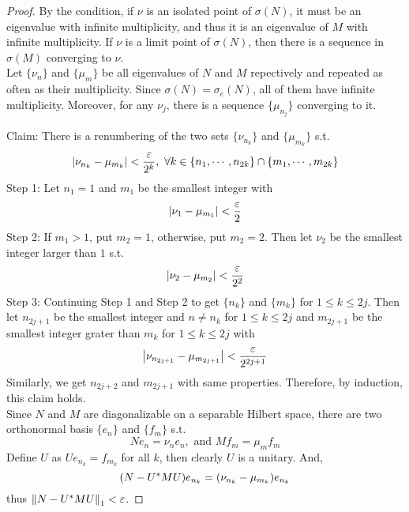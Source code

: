 \documentclass[a4paper,11pt]{report}
\begin{document}
\begin{proof}
	By the condition, if $\nu$ is an isolated point of $\sigma(N)$, it must be an eigenvalue with infinite multiplicity, and thus it is an eigenvalue of $M$ with infinite multiplicity. If $\nu$ is a limit point of $\sigma(N)$, then there is a sequence in $\sigma(M)$ converging to $\nu$. \\
	Let $\{\nu_n\}$ and $\{\mu_m\}$ be all eigenvalues of $N$ and $M$ repectively and repeated as often as their multiplicity. Since $\sigma(N) = \sigma_e(N)$, all of them have infinite multiplicity. Moreover, for any $\nu_j$, there is a sequence $\{\mu_{n_j}\}$ converging to it.
	\item Claim: There is a renumbering of the two sets $\{\nu_{n_k}\}$ and $\{\mu_{m_k}\}$ s.t. 
	\begin{equation*}
		\left\lvert\nu_{n_k} - \mu_{m_k}\right\lvert < \frac{\varepsilon}{2^k},~ \forall k \in \{n_1, \cdots, n_{2k}\} \cap \{m_1, \cdots, m_{2k}\}
	\end{equation*}
	Step 1: Let $n_1 = 1$ and $m_1$ be the smallest integer with 
	\begin{equation*}
		\left\lvert\nu_1 - \mu_{m_1}\right\lvert < \frac{\varepsilon}{2}
	\end{equation*}
	Step 2: If $m_1 > 1$, put $m_2 = 1$, otherwise, put $m_2 =2$. Then let $\nu_2$ be the smallest integer larger than $1$ s.t.
	\begin{equation*}
		\left\lvert\nu_2 - \mu_{m_2}\right\lvert < \frac{\varepsilon}{2^2}
	\end{equation*}
	Step 3: Continuing Step 1 and Step 2 to get $\{n_k\}$ and $\{m_k\}$ for $1 \leqslant k \leqslant 2j$. Then let $n_{2j+1}$ be the smallest integer and $n \neq n_k$ for $1 \leqslant k \leqslant 2j$ and $m_{2j+1}$ be the smallest integer grater than $m_k$ for $1 \leqslant k \leqslant 2j$ with
	\begin{equation*}
		\left\lvert\nu_{n_{2j+1}} - \mu_{m_{2j+1}}\right\lvert < \frac{\varepsilon}{2^{2j+1}}
	\end{equation*}
	Similarly, we get $n_{2j+2}$ and $m_{2j+1}$ with same properties. Therefore, by induction, this claim holds.\\
	Since $N$ and $M$ are diagonalizable on a separable Hilbert space, there are two orthonormal basis $\{e_n\}$ and $\{f_m\}$ s.t. 
	\begin{equation*}
		Ne_n = \nu_n e_n, \text{ and } Mf_m = \mu_m f_m
	\end{equation*}
	Define $U$ as $Ue_{n_k} = f_{m_k}$ for all $k$, then clearly $U$ is a unitary. And,
	\begin{equation*}
		(N-U^{*}MU)e_{n_k} = (\nu_{n_k} - \mu_{m_k}) e_{n_k}
	\end{equation*}
	thus $\left\lVert N-U^{*}MU\right\lVert_1 < \varepsilon$.
\end{proof}
\end{document}
